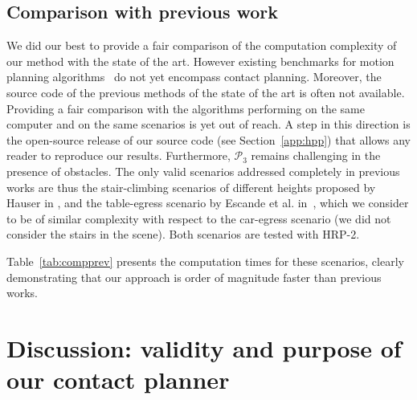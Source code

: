 \documentclass[journal]{IEEEtran}
\providecommand{\DIFaddtex}[1]{#1} %
\providecommand{\DIFdeltex}[1]{} %
\providecommand{\DIFaddbegin}{\protect\color{blue}} %
\providecommand{\DIFaddend}{\protect\color{black}} %
\providecommand{\DIFdelbegin}{\protect\cbdelete} %
\providecommand{\DIFdelend}{} %
\providecommand{\DIFadd}[1]{\texorpdfstring{\DIFaddtex{#1}}{#1}} %
\providecommand{\DIFdel}[1]{\texorpdfstring{\DIFdeltex{#1}}{}} %
\begin{document}
\DIFdelend \subsection{Comparison with previous work} \label{sec:compa}
We did our best to provide a fair comparison of the computation complexity of our method with the state of the art. 
However existing benchmarks for motion planning algorithms~\cite{moll2014extensible} do not yet encompass contact planning.
Moreover, the source code of the previous methods of the state of the art is often not available.
Providing a fair comparison with the algorithms performing on the same computer and on the same scenarios is yet out of reach.
A step in this direction is the open-source release of our source code (see \DIFdelbegin \DIFdel{Appendix}\DIFdelend \DIFaddbegin \DIFadd{Section}\DIFaddend ~\ref{app:hpp}) that allows any reader to reproduce our results.
Furthermore, $\mathcal{P}_3$ remains challenging in the presence of obstacles. The only valid scenarios addressed completely in previous works are thus the stair-climbing scenarios of different heights proposed by Hauser in \cite{Hauser06usingmotion}, and the table-egress scenario by Escande et al. in~\cite{DBLP:conf/iser/EscandeKMG08}, which we consider to be of similar complexity with respect to the car-egress scenario (we did not consider the stairs in the scene). Both scenarios are tested with HRP-2.

Table~\ref{tab:compprev} presents the computation times for these scenarios, clearly demonstrating that our approach is order of magnitude faster than previous works.




 \section{Discussion: validity and purpose of our contact planner} 
\label{sec:discussion}
\end{document}
